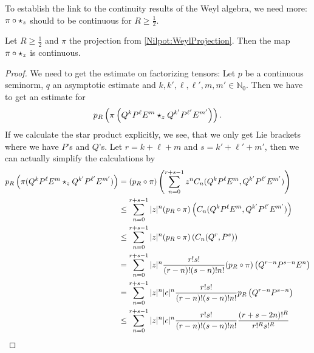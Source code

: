 To establish the link to the continuity results of the Weyl algebra,
we need more: $\pi \circ \star_z$ should to be continuous for $R \geq \frac 
1 2$.
\begin{proposition}
    \label{proposition:ContinuousProductInWeyl}%
    Let $R \geq \frac{1}{2}$ and $\pi$ the projection from
    \eqref{Nilpot:WeylProjection}. Then the map $\pi \circ
    \star_z$ is continuous.
\end{proposition}
\begin{proof}
    We need to get the estimate on factorizing tensors: Let $p$ be a
    continuous seminorm, $q$ an asymptotic estimate and $k, k',
    \ell, \ell', m, m' \in \mathbb{N}_0$. Then we have to get an
    estimate for
    \begin{align*}
        p_R \left(
            \pi\left(
                Q^k P^{\ell} E^m \star_z Q^{k'} P^{\ell'} E^{m'}
            \right)
        \right).
    \end{align*}
    If we calculate the star product explicitly, we see, that we only
    get Lie brackets where we have $P$'s and $Q$'s. Let $r = k + \ell
    + m$ and $s = k' + \ell' + m'$, then we can actually simplify the
    calculations by
    \begin{align*}
        p_R \left(
        \pi(Q^k P^{\ell} E^m
        \ostar_z    Q^{k'} P^{\ell'} E^{m'}
        ) \right)
        & =
        (p_R \circ \pi) \left(
        \sum\limits_{n=0}^{r + s - 1}
        z^n C_n(Q^k P^{\ell} E^m,
        Q^{k'} P^{\ell'} E^{m'})
        \right)
        \\
        & \leq
        \sum\limits_{n=0}^{r + s - 1}
        |z|^n
        (p_R \circ \pi) \left(
        C_n(Q^k P^{\ell} E^m,
        Q^{k'} P^{\ell'} E^{m'})
        \right)
        \\
        & \leq
        \sum\limits_{n=0}^{r + s - 1}
        |z|^n
        (p_R \circ \pi) \left(
        C_n(Q^r, P^s)
        \right)
        \\
        & =
        \sum\limits_{n=0}^{r + s - 1}
        |z|^n
        \frac{r! s!}{(r-n)! (s-n)! n!}
        (p_R \circ \pi) \left(
        Q^{r-n} P^{s-n} E^n
        \right)
        \\
        & =
        \sum\limits_{n=0}^{r + s - 1}
        |z|^n |c|^n
        \frac{r! s!}{(r-n)! (s-n)! n!}
        p_R \left(
        Q^{r-n} P^{s-n}
        \right)
        \\
        & \leq
        \sum\limits_{n=0}^{r + s - 1}
        |z|^n |c|^n
        \frac{r! s!}{(r-n)! (s-n)! n!}
        \frac{(r + s - 2n)!^R}{r!^R s!^R}

\end{align*}
\end{proof}

